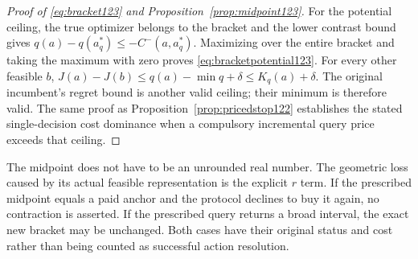 \begin{proof}[Proof of \eqref{eq:bracket123} and Proposition~\ref{prop:midpoint123}]
For the potential ceiling, the true optimizer belongs to the
bracket and the lower contrast bound gives
$q(a)-q(a_q^*)\le-C^-(a,a_q^*)$. Maximizing over the entire
bracket and taking the maximum with zero proves
\eqref{eq:bracketpotential123}. For every other feasible $b$,
$J(a)-J(b)\le q(a)-\min q+\delta\le K_q(a)+\delta$.
The original incumbent's regret bound is another valid ceiling;
their minimum is therefore valid. The same proof as
Proposition~\ref{prop:pricedstop122} establishes the stated
single-decision cost dominance when a compulsory incremental
query price exceeds that ceiling.
\end{proof}

The midpoint does not have to be an unrounded real number. The
geometric loss caused by its actual feasible representation is
the explicit $r$ term. If the prescribed midpoint equals a paid
anchor and the protocol declines to buy it again, no contraction
is asserted. If the prescribed query returns a broad interval,
the exact new bracket may be unchanged. Both cases have their
original status and cost rather than being counted as successful
action resolution.
